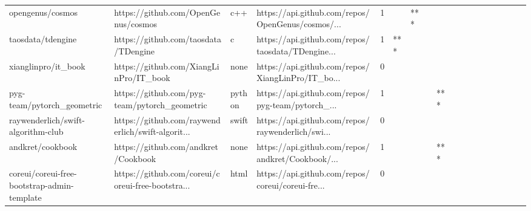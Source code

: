 \begin{tabular}{llllrlllllllllllll}
opengenus/cosmos                                   &                https://github.com/OpenGenus/cosmos &               c++ &  https://api.github.com/repos/OpenGenus/cosmos/... &       1 &         &    *** &           &                &                 &        &           &           &          &          &       &              &          \\
taosdata/tdengine                                  &               https://github.com/taosdata/TDengine &                 c &  https://api.github.com/repos/taosdata/TDengine... &       1 &     *** &        &           &                &                 &        &           &           &          &          &       &              &          \\
xianglinpro/it\_book                                &             https://github.com/XiangLinPro/IT\_book &              none &  https://api.github.com/repos/XiangLinPro/IT\_bo... &       0 &         &        &           &                &                 &        &           &           &          &          &       &              &          \\
pyg-team/pytorch\_geometric                         &      https://github.com/pyg-team/pytorch\_geometric &            python &  https://api.github.com/repos/pyg-team/pytorch\_... &       1 &         &        &           &            *** &                 &        &           &           &          &          &       &              &          \\
raywenderlich/swift-algorithm-club                 &  https://github.com/raywenderlich/swift-algorit... &             swift &  https://api.github.com/repos/raywenderlich/swi... &       0 &         &        &           &                &                 &        &           &           &          &          &       &              &          \\
andkret/cookbook                                   &                https://github.com/andkret/Cookbook &              none &  https://api.github.com/repos/andkret/Cookbook/... &       1 &         &        &           &            *** &                 &        &           &           &          &          &       &              &          \\
coreui/coreui-free-bootstrap-admin-template        &  https://github.com/coreui/coreui-free-bootstra... &              html &  https://api.github.com/repos/coreui/coreui-fre... &       0 &         &        &           &                &                 &        &           &           &          &          &       &              &          \\

\end{tabular}

